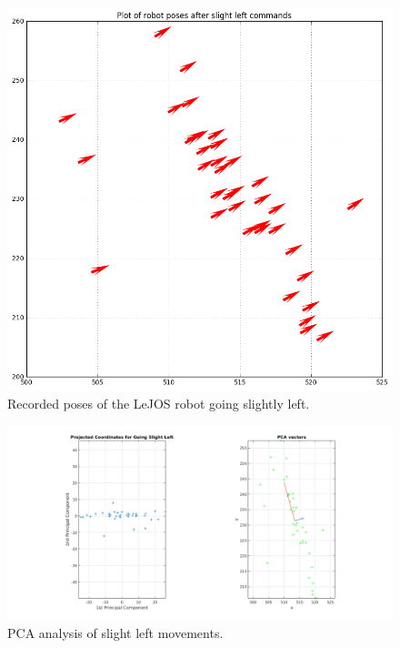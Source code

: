\documentclass[paper=a4, fontsize=11pt]{scrartcl} %
\begin{document}
    \begin{figure}[h!]
        \begin{center}
            \setlength{\fboxsep}{0.5pt} %
            \setlength{\fboxrule}{0.5pt}
            \includegraphics[width=0.7\linewidth,fbox]{images/poses_plot_2_slightLeft.png}
            \caption{Recorded poses of the LeJOS robot going slightly left.}
        \end{center}
    \end{figure}

    \begin{figure}[h!]
        \begin{center}
            \setlength{\fboxsep}{0.5pt} %
            \setlength{\fboxrule}{0.5pt}
            \includegraphics[width=\linewidth,fbox]{images/pca_slightLeft.png}
            \caption{PCA analysis of slight left movements.}
        \end{center}
    \end{figure}
\end{document}
